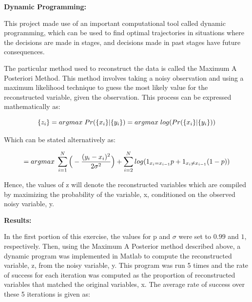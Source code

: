 \documentclass[12pt]{article} %
\begin{document}
\vspace{3mm}
\noindent
\textbf{Dynamic Programming:}

\vspace{3mm}
This project made use of an important computational tool called dynamic programming, which can be used to find optimal trajectories in situations where the decisions are made in stages, and decisions made in past stages have future consequences.

\vspace{3mm}
The particular method used to reconstruct the data is called the Maximum A Posteriori Method. This method involves taking a noisy observation and using a maximum likelihood technique to guess the most likely value for the reconstructed variable, given the observation. This process can be expressed mathematically as:

\begin{equation*}
\{z_{i}\} = argmax \hspace{1mm} Pr(\{ x_{i} \} \vert \{y_{i} \}) = argmax \hspace{1mm} log(Pr(\{x_{i}\} \vert \{y_{i}\}))
\end{equation*}

\vspace{3mm}
\noindent
Which can be stated alternatively as:

\begin{equation*}
= argmax \hspace{1mm} \sum_{i = 1}^{N} \Big( - \frac{(y_{i} - x_{i})^{2}}{2 \sigma^{2}} \Big) + \sum_{i=2}^{N} log(1_{x_{i} = x_{i-1}} p + 1_{x_{i} \neq x_{i-1}} (1-p))
\end{equation*}

\vspace{3mm}
Hence, the values of z will denote the reconstructed variables which are compiled by maximizing the probability of the variable, x, conditioned on the observed noisy variable, y.


\vspace{3mm}
\noindent
\textbf{Results:}

\vspace{3mm}
In the first portion of this exercise, the values for p and $\sigma$ were set to $0.99$ and $1$, respectively. Then, using the Maximum A Posterior method described above, a dynamic program was implemented in Matlab to compute the reconstructed variable, z, from the noisy variable, y. This program was run 5 times and the rate of success for each iteration was computed as the proportion of reconstructed variables that matched the original variables, x. The average rate of success over these 5 iterations is given as:
\end{document}
